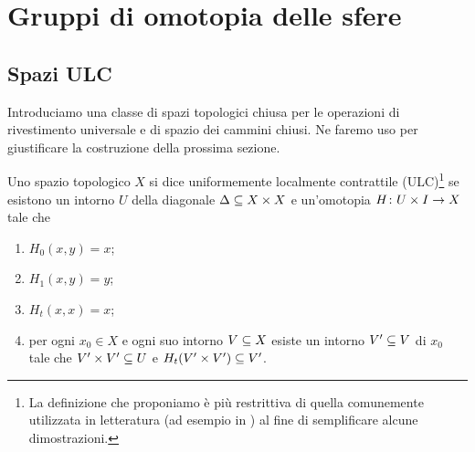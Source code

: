 \chapter{Gruppi di omotopia delle sfere}

\section{Spazi ULC}

Introduciamo una classe di spazi topologici chiusa per le operazioni di rivestimento universale e di spazio dei cammini chiusi. Ne faremo uso per giustificare la costruzione della prossima sezione.

\begin{definition}
Uno spazio topologico $X$ si dice uniformemente localmente contrattile (ULC)\footnote{La definizione che proponiamo è più restrittiva di quella comunemente utilizzata in letteratura (ad esempio in ) al fine di semplificare alcune dimostrazioni.} se esistono un intorno $U$ della diagonale $\Delta\subseteq X\times X$ e un'omotopia $H\colon U\times I\to X$ tale che
\begin{enumerate}
\item\label{ULC:pr1} $H_0(x,y)=x$;
\item\label{ULC:pr2} $H_1(x,y)=y$;
\item\label{ULC:pr3} $H_t(x,x)=x$;
\item\label{ULC:pr4} per ogni $x_0\in X$ e ogni suo intorno $V\subseteq X$ esiste un intorno $V'\subseteq V$ di $x_0$ tale che $V'\times V'\subseteq U$ e $H_t(V'\times V')\subseteq V'$.
\end{enumerate}
\end{definition}

